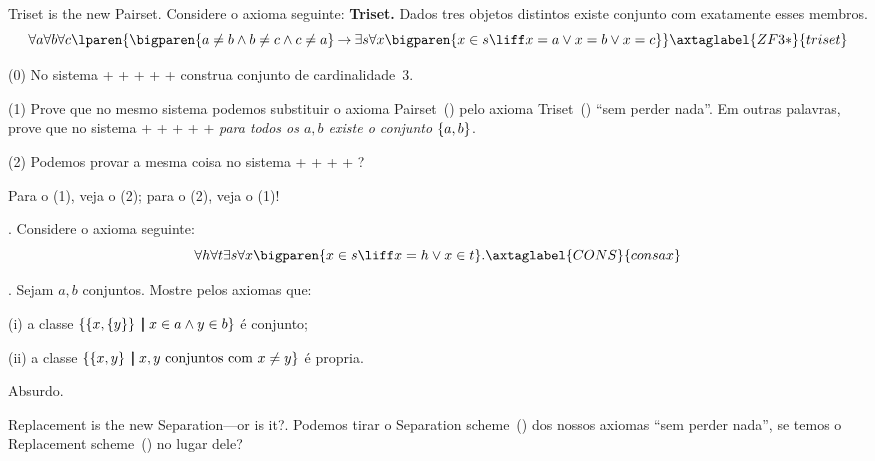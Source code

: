 {{%
\problem Triset is the new Pairset.
\label{triset_problem}%
Considere o axioma seguinte:
\endgraf\noindent
{\bf Triset.}
{\proclaimstyle
Dados tres objetos distintos existe conjunto com exatamente
esses membros.
}
$$
\forall a
\forall b
\forall c
\lparen{
\bigparen{
a\neq b \land b \neq c \land c \neq a
}
\limplies
\exists s
\forall x
\bigparen{x\in s \liff x = a \lor x = b \lor x = c}
}
\axtaglabel{ZF3*}{triset}
$$
\item{(0)}
No sistema
%
+%
+%
+%
+%
+
construa conjunto de cardinalidade~$3$.
\item{(1)}
Prove que no mesmo sistema
podemos substituir o axioma Pairset~() pelo axioma
Triset~() ``sem perder nada''.
Em outras palavras, prove que no sistema
%
+%
+%
+%
+%
+
\emph{para todos os $a,b$ existe o conjunto $\left\{a,b\right\}$}.
\item{(2)}
Podemos provar a mesma coisa no sistema
%
+%
+%
+%
+%
?

\hint
Para o (1), veja o (2); para o (2), veja o (1)!

\endproblem

\problem.
\label{consax_problem}%
Considere o axioma seguinte:
$$
\forall h
\forall t
\exists s
\forall x
\bigparen{
x \in s
\liff
x = h
\lor
x \in t
}.
\axtaglabel{CONS}{consax}
$$

\endproblem

\problem.
\label{one_class_set_the_other_proper_problem}%
Sejam $a,b$ conjuntos.
Mostre pelos axiomas que:
\item{(i)}  a classe $\left\{ \left\{x,\left\{y\right\}\right\} \;\mathord{\pmb{\mid}}\; x \in a \land y \in b\right\}$ é conjunto;
\item{(ii)} a classe $\left\{ \left\{x,y\right\} \;\mathord{\pmb{\mid}}\; \text{$x,y$ conjuntos com $x\neq y$}\right\}$ é propria.

\hint
Absurdo.

\endproblem

\problem Replacement is the new Separation---or is it?.
\label{replacement_replaces_separation}%
Podemos tirar o Separation scheme~()
dos nossos axiomas ``sem perder nada'', se temos o
Replacement scheme~() no lugar dele?

}}
